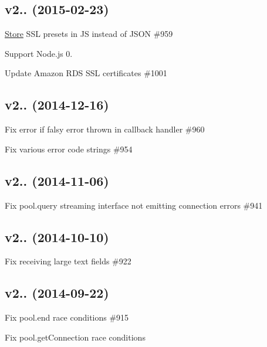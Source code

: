 \subsection*{v2.. (2015-\/02-\/23)}


\begin{DoxyItemize}
\item \hyperlink{class_store}{Store} S\+S\+L presets in J\+S instead of J\+S\+O\+N \#959
\item Support Node.\+js 0.
\item Update Amazon R\+D\+S S\+S\+L certificates \#1001
\end{DoxyItemize}

\subsection*{v2.. (2014-\/12-\/16)}


\begin{DoxyItemize}
\item Fix error if falsy error thrown in callback handler \#960
\item Fix various error code strings \#954
\end{DoxyItemize}

\subsection*{v2.. (2014-\/11-\/06)}


\begin{DoxyItemize}
\item Fix {\ttfamily pool.\+query} streaming interface not emitting connection errors \#941
\end{DoxyItemize}

\subsection*{v2.. (2014-\/10-\/10)}


\begin{DoxyItemize}
\item Fix receiving large text fields \#922
\end{DoxyItemize}

\subsection*{v2.. (2014-\/09-\/22)}


\begin{DoxyItemize}
\item Fix {\ttfamily pool.\+end} race conditions \#915
\item Fix {\ttfamily pool.\+get\+Connection} race conditions
\end{DoxyItemize}

